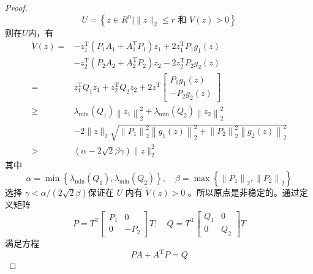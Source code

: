 \begin{proof}
    \begin{equation}
        U=\left\{z \in R^n \mid\|z\|_2 \leqslant r \text { 和 } V(z)>0\right\}
    \end{equation}
    则在$U$内，有
    \begin{equation}
        \begin{aligned}
        \dot{V}(z)= & -z_1^{\mathrm{T}}\left(P_1 A_1+A_1^{\mathrm{T}} P_1\right) z_1+2 z_1^{\mathrm{T}} P_1 g_1(z) \\
        & -z_2^{\mathrm{T}}\left(P_2 A_2+A_2^{\mathrm{T}} P_2\right) z_2-2 z_2^{\mathrm{T}} P_2 g_2(z) \\
        = & z_1^{\mathrm{T}} Q_1 z_1+z_2^{\mathrm{T}} Q_2 z_2+2 z^{\mathrm{T}}\left[\begin{array}{c}
        P_1 g_1(z) \\
        -P_2 g_2(z)
        \end{array}\right] \\
        \geqslant & \lambda_{\min }\left(Q_1\right)\left\|z_1\right\|_2^2+\lambda_{\min }\left(Q_2\right)\left\|z_2\right\|_2^2 \\
        & -2\|z\|_2 \sqrt{\left\|P_1\right\|_2^2\left\|g_1(z)\right\|_2^2+\left\|P_2\right\|_2^2\left\|g_2(z)\right\|_2^2} \\
        > & (\alpha-2 \sqrt{2} \beta \gamma)\|z\|_2^2
        \end{aligned}
    \end{equation}
    其中
    \begin{equation}
        \alpha=\min \left\{\lambda_{\min }\left(Q_1\right), \lambda_{\min }\left(Q_2\right)\right\}, \quad \beta=\max \left\{\left\|P_1\right\|_2,\left\|P_2\right\|_2\right\}
    \end{equation}
    选择 $\gamma<\alpha /(2 \sqrt{2} \beta)$保证在 $U$ 内有 $\dot{V}(z)>0$ 。所以原点是非稳定的。通过定义矩阵
    \begin{equation}
        P=T^{\mathrm{T}}\left[\begin{array}{cc}
        P_1 & 0 \\
        0 & -P_2
        \end{array}\right] T ; \quad Q=T^{\mathrm{T}}\left[\begin{array}{cc}
        Q_1 & 0 \\
        0 & Q_2
        \end{array}\right] T
    \end{equation}
    满足方程
    \begin{equation}
        P A+A^{\mathrm{T}} P=Q
    \end{equation}

\end{proof}
